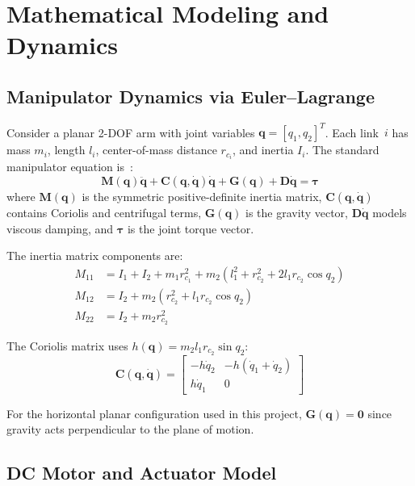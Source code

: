 \documentclass[conference]{IEEEtran}
\begin{document}
\section{Mathematical Modeling and Dynamics}
\label{sec:modeling}

\subsection{Manipulator Dynamics via Euler--Lagrange}

Consider a planar 2-DOF arm with joint variables $\mathbf{q} = [q_1, q_2]^T$. Each link~$i$ has mass $m_i$, length $l_i$, center-of-mass distance $r_{c_i}$, and inertia $I_i$. The standard manipulator equation is~\cite{spong2020}:
\begin{equation}
\mathbf{M}(\mathbf{q})\ddot{\mathbf{q}} + \mathbf{C}(\mathbf{q},\dot{\mathbf{q}})\dot{\mathbf{q}} + \mathbf{G}(\mathbf{q}) + \mathbf{D}\dot{\mathbf{q}} = \boldsymbol{\tau}
\label{eq:dynamics}
\end{equation}
where $\mathbf{M}(\mathbf{q})$ is the symmetric positive-definite inertia matrix, $\mathbf{C}(\mathbf{q},\dot{\mathbf{q}})$ contains Coriolis and centrifugal terms, $\mathbf{G}(\mathbf{q})$ is the gravity vector, $\mathbf{D}\dot{\mathbf{q}}$ models viscous damping, and $\boldsymbol{\tau}$ is the joint torque vector.

The inertia matrix components are:
\begin{align}
M_{11} &= I_1 + I_2 + m_1 r_{c_1}^2 + m_2(l_1^2 + r_{c_2}^2 + 2l_1 r_{c_2}\cos q_2) \label{eq:M11}\\
M_{12} &= I_2 + m_2(r_{c_2}^2 + l_1 r_{c_2}\cos q_2) \label{eq:M12}\\
M_{22} &= I_2 + m_2 r_{c_2}^2 \label{eq:M22}
\end{align}

The Coriolis matrix uses $h(\mathbf{q}) = m_2 l_1 r_{c_2}\sin q_2$:
\begin{equation}
\mathbf{C}(\mathbf{q},\dot{\mathbf{q}}) = \begin{bmatrix} -h\dot{q}_2 & -h(\dot{q}_1 + \dot{q}_2) \\ h\dot{q}_1 & 0 \end{bmatrix}
\label{eq:coriolis}
\end{equation}

For the horizontal planar configuration used in this project, $\mathbf{G}(\mathbf{q}) = \mathbf{0}$ since gravity acts perpendicular to the plane of motion.

\subsection{DC Motor and Actuator Model}
\end{document}
